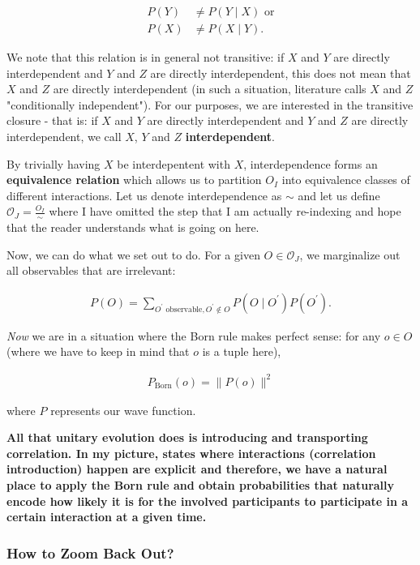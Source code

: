 \documentclass{article}
\begin{document}
\begin{align*}
P(Y) &\neq P(Y\mid X) \text{ or} \\
P(X) &\neq P(X\mid Y).
\end{align*}

We note that this relation is in general not transitive: if $X$ and $Y$ are directly interdependent and $Y$ and $Z$ are directly interdependent, this does not mean that $X$ and $Z$ are directly interdependent (in such a situation, literature calls $X$ and $Z$ "conditionally independent"). For our purposes, we are interested in the transitive closure - that is: if $X$ and $Y$ are directly interdependent and $Y$ and $Z$ are directly interdependent, we call $X$, $Y$ and $Z$ \textbf{interdependent}.

By trivially having $X$ be interdepentent with $X$, interdependence forms an \textbf{equivalence relation} which allows us to partition $O_I$ into equivalence classes of different interactions. Let us denote interdependence as $\sim$ and let us define $\mathcal{O}_J = \frac{O_I}{\sim}$ where I have omitted the step that I am actually re-indexing and hope that the reader understands what is going on here.

Now, we can do what we set out to do. For a given $O\in\mathcal{O}_J$, we marginalize out all observables that are irrelevant:

\begin{align*}
P(O) = \sum_{O^\prime \text{ observable}, O^\prime \notin O} P(O\mid O^\prime) P(O^\prime).
\end{align*}

\textit{Now} we are in a situation where the Born rule makes perfect sense: for any $o\in O$ (where we have to keep in mind that $o$ is a tuple here),

\begin{align*}
P_{\text{Born}}(o) = \|P(o)\|^2
\end{align*}

where $P$ represents our wave function.

\textbf{All that unitary evolution does is introducing and transporting correlation. In my picture, states where interactions (correlation introduction) happen are explicit and therefore, we have a natural place to apply the Born rule and obtain probabilities that naturally encode how likely it is for the involved participants to participate in a certain interaction at a given time.}

\subsubsection{How to Zoom Back Out?}
\end{document}
